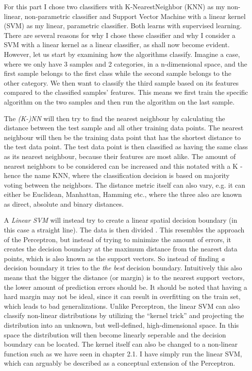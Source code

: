 \documentclass{article}
\theoremstyle{plain}
\theoremstyle{nonumberplain}
\begin{document}
For this part I chose two classifiers with K-NearestNeighbor (KNN) as my non-linear, non-parametric classifier and Support Vector Machine with a linear kernel (SVM) as my linear, parametric classifier.
Both learns with supervised learning.
There are several reasons for why I chose these classifier and why I consider a SVM with a linear kernel as a linear classifier, as shall now become evident.
However, let us start by examining how the algorithms classify.
Imagine a case, where we only have 3 samples and 2 categories, in a n-dimensional space, and the first sample belongs to the first class while the second sample belongs to the other category.
We then want to classify the third sample based on its features compared to the classified samples' features. This means we first train the specific algorithm on the two samples and then run the algorithm on the last sample. \medskip

The \textit{(K-)NN} will then try to find the nearest neighbour by calculating the distance between the test sample and all other training data points. The nearest neighbour will then be the training data point that has the shortest distance to the test data point. The test data point is then classified as having the same class as its nearest neighbour, because their features are most alike.
The amount of nearest neighbors to be considered can be increased and this notated with a K - hence the name KNN, where the classification decision is based on majority voting between the neighbors. 
The distance metric itself can also vary, e.g. it can either be Euclidean, Manhattan, Hamming etc., where the three also are known as direct, absolute and binary distances.

A \textit{Linear SVM} will instead try to create a linear spatial decision boundary (in this case a straight line). The data is then divided   . This resembles the approach of the Perceptron, but instead of trying to minimize the amount of errors, it creates the decision boundary at the maximum distance from the nearest data points, which is also known as the support vectors. So instead of finding \textit{a} decision boundary it tries to the \textit{the best} decision boundary.
Intuitively this also means that the bigger the distance (or margin) is to the nearest support vectors, the lower amount of prediction errors should be.
It should be noted that having a hard margin may not be ideal, since it can result in overfitting on the train set, which leads  to bad generalizations.
Unlike Perceptron, the linear SVM can also classify non-linear distributions by utilizing the ``kernel trick'' and projecting the distribution into an unknown, but well-defined, high-dimensional space. In this space the distribution will then become linearly seperable and the decision boundary can be located.
The kernel itself can also be changed to a non-linear function such as we have seen in chapter 2.1.
I have simply run the linear SVM, which can arguably be described as a conceptual extension of the Perceptron. \medskip
\end{document}
